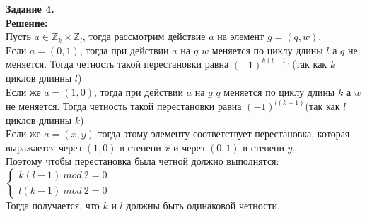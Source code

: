 \documentclass[12pt,a4paper]{scrartcl}
\begin{document}
	\textbf{Задание 4.} \\
	\textbf{Решение:} 
	\\
	\indent
	Пусть $a \in \mathbb{Z}_k \times \mathbb{Z}_l$, тогда рассмотрим действие $a$ на элемент $g = (q, w)$.\\
	Если $a = (0, 1)$, тогда при действии $a$ на $g$ $w$ меняется по циклу длины $l$ а $q$ не меняется. Тогда четность такой перестановки равна $(-1)^{k(l - 1)}$(так как $k$ циклов длинны $l$) \\
	Если же $a = (1, 0)$, тогда при действии $a$ на $g$ $q$ меняется по циклу длины $k$ а $w$ не меняется. Тогда четность такой перестановки равна $(-1)^{l(k - 1)}$(так как $l$ циклов длинны $k$)\\
	Если же $a = (x, y)$ тогда этому элементу соответствует перестановка, которая выражается через $(1, 0)$ в степени $x$ и через $(0, 1)$ в степени $y$.\\
	Поэтому чтобы перестановка была четной должно выполнятся:\\
	$\begin{cases}
	k(l - 1)~mod ~2 = 0\\
	l(k - 1) ~mod ~2 = 0
	\end{cases}$ \\
	Тогда получается, что $k$ и $l$ должны быть одинаковой четности.
\end{document}
